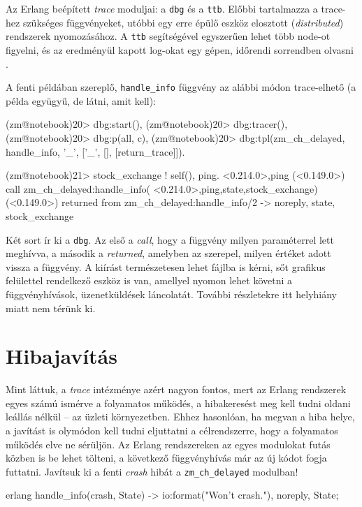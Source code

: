 \documentclass[12pt, a4paper, oneside]{book}
\begin{document}
Az Erlang beépített \emph{trace} moduljai: a \texttt{dbg} és a \texttt{ttb}.
Előbbi tartalmazza a trace-hez szükséges függvényeket, utóbbi egy erre épülő
eszköz elosztott (\emph{distributed}) rendszerek nyomozásához. A \texttt{ttb}
segítségével egyszerűen lehet több node-ot figyelni, és az eredményül kapott
log-okat egy gépen, időrendi sorrendben olvasni \citep{ErlangDoc}.

A fenti példában szereplő, \texttt{handle\_info} függvény
az alábbi módon trace-elhető (a példa együgyű, de látni, amit kell):

\begin{code}{}{}
(zm@notebook)20> dbg:start(),
(zm@notebook)20> dbg:tracer(),
(zm@notebook)20> dbg:p(all, c),
(zm@notebook)20> dbg:tpl(zm_ch_delayed, handle_info, '_', 
                  [{'_', [], [{return_trace}]}]).

(zm@notebook)21> stock_exchange ! {self(), ping}.
{<0.214.0>,ping}
(<0.149.0>) call zm_ch_delayed:handle_info(
                 {<0.214.0>,ping},{state,stock_exchange})
(<0.149.0>) returned from zm_ch_delayed:handle_info/2 -> 
                 {noreply, {state, stock_exchange}}
\end{code}

Két sort ír ki a \texttt{dbg}. Az első a \emph{call}, hogy a függvény milyen
paraméterrel lett meghívva, a második a \emph{returned}, amelyben az szerepel,
milyen értéket adott vissza a függvény. A kiírást természetesen lehet fájlba is
kérni, sőt grafikus felülettel rendelkező eszköz is van, amellyel nyomon lehet
követni a függvényhívások, üzenetküldések láncolatát. További részletekre itt
helyhiány miatt nem térünk ki.

\section{Hibajavítás}
Mint láttuk, a \emph{trace} intézménye azért nagyon fontos, mert az
Erlang rendszerek egyes számú ismérve a folyamatos működés, a hibakeresést meg
kell tudni oldani leállás nélkül -- az üzleti környezetben. Ehhez hasonlóan, ha
megvan a hiba helye, a javítást is olymódon kell tudni eljuttatni a
célrendszerre, hogy a folyamatos működés elve ne sérüljön. Az Erlang
rendszereken az egyes modulokat futás közben is be lehet tölteni, a következő
függvényhívás már az új kódot fogja futtatni. Javítsuk ki a fenti \emph{crash}
hibát a \texttt{zm\_ch\_delayed} modulban!

\begin{code}{erlang}{}
handle_info(crash, State) ->
  io:format("Won't crash.\n"),
  {noreply, State};
\end{code} 
\end{document}

